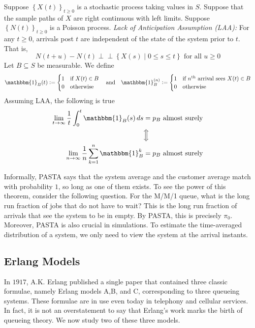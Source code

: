 \documentclass[12pt]{article}
\newcommand{\indep}{\perp \!\!\! \perp}
\theoremstyle{definition}
\begin{document}
\begin{thm}[PASTA]
    Suppose $\left\{ X(t) \right\}_{t \geq 0}$ is a stochastic process taking values in $S$. Suppose that the sample paths of $X$ are right continuous with left limits. Suppose $\left\{N(t)\right\}_{t \geq 0}$ is a Poisson process. \emph{Lack of Anticipation Assumption (LAA):} For any $t \geq 0$, arrivals post $t$ are independent of the state of the system prior to $t$. That is,
    \[
        N(t+u) - N(t) \indep \left\{ X(s) \mid 0 \leq s \leq t \right\} \text{ for all } u \geq 0
    \]
    Let $B \subseteq S$ be measurable. We define
    \[
        \mathbbm{1}_{B}(t) \vcentcolon= \begin{cases}
            1 & \text{if } X(t) \in B \\
            0 & \text{otherwise}
        \end{cases}
        \quad \text{and} \quad
        \mathbbm{1}_B^{(n)} \vcentcolon= \begin{cases}
            1 & \text{if $n^{\text{th}}$ arrival sees } X(t) \in B \\
            0 & \text{otherwise}
        \end{cases}
    \]
    Assuming LAA, the following is true
    \begin{align*}
        \lim_{t \to \infty} \frac{1}{t} \int_0^t \mathbbm{1}_B(s) \, ds &= p_B \text{ almost surely} \\
        &\Big\Updownarrow \\
        \lim_{n \to \infty} \frac{1}{n} \sum_{k=1}^n \mathbbm{1}_B^k &= p_B \text{ almost surely}
    \end{align*}
\end{thm}

Informally, PASTA says that the system average and the customer average match with probability $1$, so long as one of them exists. To see the power of this theorem, consider the following question. For the M/M/1 queue, what is the long run fraction of jobs that do not have to wait? This is the long run fraction of arrivals that see the system to be in empty. By PASTA, this is precisely $\pi_0$. Moreover, PASTA is also crucial in simulations. To estimate the time-averaged distribution of a system, we only need to view the system at the arrival instants.

\subsection{Erlang Models}

In $1917$, A.K. Erlang published a single paper that contained three classic formulae, namely Erlang models A,B, and C, corresponding to three queueing systems. These formulae are in use even today in telephony and cellular services. In fact, it is not an overstatement to say that Erlang's work marks the birth of queueing theory. We now study two of these three models.
\
\end{document}
